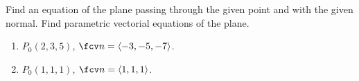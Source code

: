 Find an equation of the plane passing through the given point and with the given normal. Find parametric vectorial equations of the plane.

\begin{enumerate}
\item $P_0(2,3,5) $,  $\fcv n= \langle-3, -5, -7 \rangle$.
\item $P_0(1, 1, 1)$, $\fcv n= \langle 1,1,1 \rangle$.
\end{enumerate}